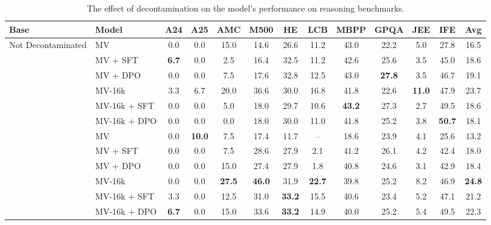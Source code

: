 \begin{table}[ht]
\centering
\caption{The effect of decontamination on the model's performance on reasoning benchmarks.}
\label{tab:evalchemy_table3}
\scriptsize
\begin{tabular}{llccccccccccc}
\toprule
\textbf{Base} & \textbf{Model} & \textbf{A24} & \textbf{A25} & \textbf{AMC} & \textbf{M500} & \textbf{HE} & \textbf{LCB} & \textbf{MBPP} & \textbf{GPQA} & \textbf{JEE} & \textbf{IFE} & \textbf{Avg} \\
\midrule
\multirow{6}{*}{Not Decontaminated} & MV & 0.0 & 0.0 & 15.0 & 14.6 & 26.6 & 11.2 & 43.0 & 22.2 & 5.0 & 27.8 & 16.5 \\
 & MV + SFT & \textbf{6.7} & 0.0 & 2.5 & 16.4 & 32.5 & 11.2 & 42.6 & 25.6 & 3.5 & 45.0 & 18.6 \\
 & MV + DPO & 0.0 & 0.0 & 7.5 & 17.6 & 32.8 & 12.5 & 43.0 & \textbf{27.8} & 3.5 & 46.7 & 19.1 \\
\cmidrule{2-13}
 & MV-16k & 3.3 & 6.7 & 20.0 & 36.6 & 30.0 & 16.8 & 41.8 & 22.6 & \textbf{11.0} & 47.9 & 23.7 \\
 & MV-16k + SFT & 0.0 & 0.0 & 5.0 & 18.0 & 29.7 & 10.6 & \textbf{43.2} & 27.3 & 2.7 & 49.5 & 18.6 \\
 & MV-16k + DPO & 0.0 & 0.0 & 0.0 & 18.0 & 30.0 & 11.0 & 41.8 & 25.2 & 3.8 & \textbf{50.7} & 18.1 \\
\midrule
\addlinespace[0.3em]
\multirow{6}{*}{Decontaminated} & MV & 0.0 & \textbf{10.0} & 7.5 & 17.4 & 11.7 & -- & 18.6 & 23.9 & 4.1 & 25.6 & 13.2 \\
 & MV + SFT & 0.0 & 0.0 & 7.5 & 28.6 & 27.9 & 2.1 & 41.2 & 26.1 & 4.2 & 42.4 & 18.0 \\
 & MV + DPO & 0.0 & 0.0 & 15.0 & 27.4 & 27.9 & 1.8 & 40.8 & 24.6 & 3.1 & 42.9 & 18.4 \\
\cmidrule{2-13}
 & MV-16k & 0.0 & 0.0 & \textbf{27.5} & \textbf{46.0} & 31.9 & \textbf{22.7} & 39.8 & 25.2 & 8.2 & 46.9 & \textbf{24.8} \\
 & MV-16k + SFT & 3.3 & 0.0 & 12.5 & 31.0 & \textbf{33.2} & 15.5 & 40.6 & 23.4 & 5.2 & 47.1 & 21.2 \\
 & MV-16k + DPO & \textbf{6.7} & 0.0 & 15.0 & 33.6 & \textbf{33.2} & 14.9 & 40.0 & 25.2 & 5.4 & 49.5 & 22.3 \\
\bottomrule
\end{tabular}
\end{table}


